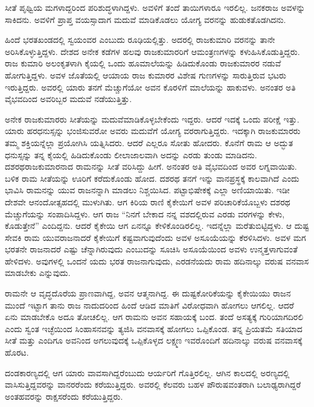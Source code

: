 ಸೀತೆ ಪೃಥ್ವಿಯ ಮಗಳಾದ್ದರಿಂದ ಪರಿಶುದ್ಧಳಾಗಿದ್ದಳು. ಅವಳಿಗೆ ತಂದೆ ತಾಯಿಗಳಾರೂ ಇರಲಿಲ್ಲ. ಜನಕರಾಜ ಅವಳನ್ನು ಸಾಕಿದನು. ಅವಳಿಗೆ ಪ್ರಾಪ್ತ ವಯಸ್ಸಾದಾಗ ಮದುವೆ ಮಾಡಿಕೊಡಲು ಯೋಗ್ಯ ವರನನ್ನು ಹುಡುಕತೊಡಗಿದನು.

ಹಿಂದೆ ಭರತಖಂಡದಲ್ಲಿ ಸ್ವಯಂವರ ಎಂಬುದು ರೂಢಿಯಲ್ಲಿತ್ತು. ಅದರಲ್ಲಿ ರಾಜಕುಮಾರಿ ವರನನ್ನು ತಾನೇ ಅರಿಸಿಕೊಳ್ಳುತ್ತಿದ್ದಳು. ದೇಶದ ಅನೇಕ ಕಡೆಗಳ ಹಲವು ರಾಜಕುಮಾರರಿಗೆ ಆಮಂತ್ರಣಗಳನ್ನು ಕಳುಹಿಸಿಕೊಡುತ್ತಿದ್ದರು. ರಾಜ ಕುಮಾರಿ ಅಲಂಕೃತಳಾಗಿ ಕೈಯಲ್ಲಿ ಒಂದು ಹೂಮಾಲೆಯನ್ನು ಹಿಡಿದುಕೊಂಡು ರಾಜಕುಮಾರರ ನಡುವೆ ಹೋಗುತ್ತಿದ್ದಳು. ಅವಳ ಜೊತೆಯಲ್ಲಿ ಆಯಾಯ ರಾಜ ಕುಮಾರರ ವಿಶೇಷ ಗುಣಗಳನ್ನು ಸಾರುತ್ತಿರುವ ಭಟರು ಇರುತ್ತಿದ್ದರು. ಅವರಲ್ಲಿ ಯಾರು ತನಗೆ ಮೆಚ್ಚುಗೆಯೋ ಅವನ ಕೊರಳಿಗೆ ಮಾಲೆಯನ್ನು ಹಾಕುವಳು. ಅನಂತರ ಅತಿ ವೈಭವದಿಂದ ಅವರಿಬ್ಬರ ಮದುವೆ ನಡೆಯುತ್ತಿತ್ತು.

ಅನೇಕ ರಾಜಕುಮಾರರು ಸೀತೆಯನ್ನು ಮದುವೆಮಾಡಿಕೊಳ್ಳಬೇಕೆಂದು ಇದ್ದರು. ಆದರೆ ಇದಕ್ಕೆ ಒಂದು ಪರೀಕ್ಷೆ ಇತ್ತು. ಯಾರು ಹರಧನುಸ್ಸನ್ನು ಭಂಜಿಸುವರೋ ಅವರು ಮದುವೆಗೆ ಯೋಗ್ಯ ವರರಾಗುತ್ತಿದ್ದರು. ಇದಕ್ಕಾಗಿ ರಾಜಕುಮಾರರು ತಮ್ಮ ಶಕ್ತಿಯನ್ನೆಲ್ಲಾ ಪ್ರಯೋಗಿಸಿ ಯತ್ನಿಸಿದರು. ಆದರೆ ಎಲ್ಲರೂ ಸೋತು ಹೋದರು. ಕೊನೆಗೆ ರಾಮ ಆ ಅದ್ಭುತ ಧನುಸ್ಸನ್ನು ತನ್ನ ಕೈಯಲ್ಲಿ ಹಿಡಿದುಕೊಂಡು ಲೀಲಾಜಾಲವಾಗಿ ಅದನ್ನು ಎರಡು ತುಂಡು ಮಾಡಿದನು. ದಶರಥರಾಜಕುಮಾರನಾದ ರಾಮನನ್ನು ಸೀತೆ ವರಿಸಿದ್ದು ಹೀಗೆ. ಅನಂತರ ಅತಿ ವೈಭವದಿಂದ ಅವರ ಲಗ್ನವಾಯಿತು. ಬಳಿಕ ರಾಮ ಸೀತೆಯನ್ನು ಊರಿಗೆ ಕರೆದುಕೊಂಡು ಹೋದ. ದಶರಥ ತನಗೆ ಇನ್ನು ವಾನಪ್ರಸ್ಥಕ್ಕೆ ಕಾಲವಾಗಿದೆ ಎಂದು ಭಾವಿಸಿ ರಾಮನನ್ನು ಯುವ ರಾಜನನ್ನಾಗಿ ಮಾಡಲು ನಿಶ್ಚಯಿಸಿದ. ಪಟ್ಟಾಭಿಷೇಕಕ್ಕೆ ಎಲ್ಲಾ ಅಣಿಯಾಯಿತು. ಇಡೀ ದೇಶವೇ ಆನಂದೋತ್ಸಹದಲ್ಲಿ ಮುಳುಗಿತು. ಆಗ ಕಿರಿಯ ರಾಣಿ ಕೈಕೇಯಿಗೆ ಅವಳ ಪರಿಚಾರಿಕೆಯೊಬ್ಬಳು ದಶರಥ ಮೆಚ್ಚುಗೆಯನ್ನು ಸಂಪಾದಿಸಿದ್ದಳು. ಆಗ ರಾಜ “ನಿನಗೆ ಬೇಕಾದ ನನ್ನ ವಶದಲ್ಲಿರುವ ಎರಡು ವರಗಳನ್ನು ಕೇಳು, ಕೊಡುತ್ತೇನೆ” ಎಂದಿದ್ದನು. ಆದರೆ ಕೈಕೇಯಿ ಆಗ ಏನನ್ನೂ ಕೇಳಿಕೊಂಡಿರಲಿಲ್ಲ. ಇದನ್ನೆಲ್ಲಾ ಮರೆತುಬಿಟ್ಟಿದ್ದಳು. ಆ ದುಷ್ಟ ಸೇವಕಿ ರಾಮ ಯುವರಾಜನಾದರೆ ಕೈಕೇಯಿಗೆ ಕಷ್ಟವಾಗುವುದೆಂದು ಅವಳ ಅಸೂಯೆಯನ್ನು ಕೆರಳಿಸಿದಳು. ಅವಳ ಮಗ ಭರತನೇ ರಾಜನಾದರೆ ಎಷ್ಟು ಚೆನ್ನಾಗಿರುವುದು ಎಂಬುದನ್ನು ಸೂಚಿಸಿ ಅಸೂಯೆಯಿಂದ ಅವಳು ಉನ್ಮತ್ತಳಾಗುವಂತೆ ಹೇಳಿದಳು. ಅವುಗಳಲ್ಲಿ ಒಂದನೆ ಯದು ಭರತ ರಾಜನಾಗುವುದು, ಎರಡನೆಯದು ರಾಮ ಹದಿನಾಲ್ಕು ವರುಷ ವನವಾಸ ಮಾಡಬೇಕು ಎನ್ನುವುದು.

ರಾಮನೇ ಆ ವೃದ್ಧದೊರೆಯ ಪ್ರಾಣವಾಗಿದ್ದ, ಅವನ ಆತ್ಮನಾಗಿದ್ದ. ಈ ದುಷ್ಟಕೋರಿಕೆಯನ್ನು ಕೈಕೇಯಿಯು ರಾಜನ ಮುಂದೆ ಇಟ್ಟಾಗ ತಾನು ರಾಜ ನಾದುದರಿಂದ ಹಿಂದೆ ಆಡಿದ ಮಾತಿಗೆ ವಿರೋಧವಾಗಿ ಹೋಗಲು ಆಗಲಿಲ್ಲ. ಆದರೆ ಏನು ಮಾಡಬೇಕೊ ಅದೂ ತೋಚಲಿಲ್ಲ. ಆಗ ರಾಮನು ಅವನ ಸಹಾಯಕ್ಕೆ ಬಂದ. ತಂದೆ ಅಸತ್ಯಕ್ಕೆ ಗುರಿಯಾಗದಿರಲಿ ಎಂದು ಸ್ವಂತ ಇಚ್ಛೆಯಿಂದ ಸಿಂಹಾಸನವನ್ನು ತ್ಯಜಿಸಿ ವನವಾಸಕ್ಕೆ ಹೋಗಲು ಒಪ್ಪಿಕೊಂಡ. ತನ್ನ ಪ್ರಿಯತಮೆ ಸತಿಯಾದ ಸೀತೆ ಮತ್ತು ಎಂದಿಗೂ ಅವನಿಂದ ಅಗಲುವುದಕ್ಕೆ ಒಪ್ಪಿಕೊಳ್ಳದ ಲಕ್ಷ್ಮಣ ಇವರೊಂದಿಗೆ ಹದಿನಾಲ್ಕು ವರುಷ ವನವಾಸಕ್ಕೆ ಹೊರಟ.

ದಂಡಕಾರಣ್ಯದಲ್ಲಿ ಆಗ ಯಾರು ವಾವಸಾಗಿದ್ದರೆಂಬುದು ಆರ್ಯರಿಗೆ ಗೊತ್ತಿರಲಿಲ್ಲ. ಆಗಿನ ಕಾಲದಲ್ಲಿ ಅರಣ್ಯದಲ್ಲಿ ವಾಸಿಸುತ್ತಿದ್ದವರನ್ನು ವಾನರರೆಂದು ಕರೆಯುತ್ತಿದ್ದರು. ಅವರಲ್ಲಿ ಕೆಲವರು ಬಹಳ ಪೌರುಷವಂತರಾಗಿ ಬಲಾಢ್ಯರಾಗಿದ್ದರೆ ಅಂತಹವರನ್ನು ರಾಕ್ಷಸರೆಂದು ಕರೆಯುತ್ತಿದ್ದರು.

